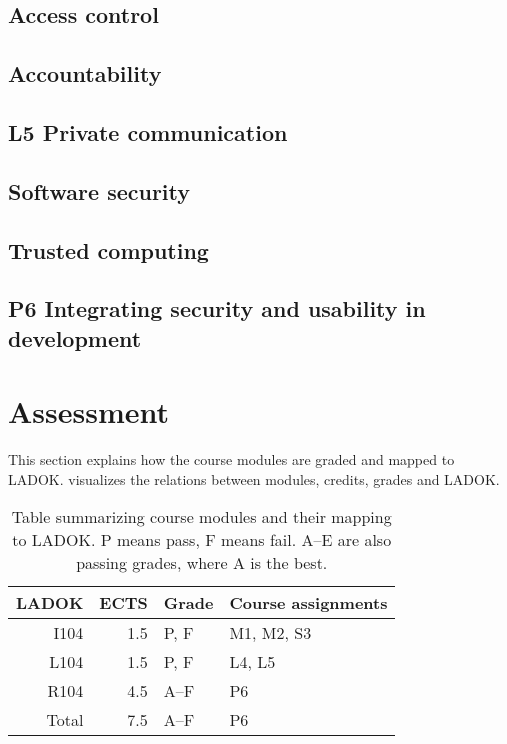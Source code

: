 \subsection{Access control}


\subsection{Accountability}


\subsection{L5 Private communication}


\subsection{Software security}


\subsection{Trusted computing}


\subsection{P6 Integrating security and usability in development}



\section{Assessment}%
\label{Assessment}

This section explains how the course modules are graded and mapped to LADOK\@.
 visualizes the relations between modules, credits, grades and 
LADOK\@.

\begin{table}
  \centering
  \setlength{\tabcolsep}{0.5em}
  \begin{tabular}{r r l l}
    \toprule
    LADOK & ECTS  & Grade       & Course assignments\\
    \midrule
    I104  & 1.5   & P, F        & M1, M2, S3\\
    L104  & 1.5   & P, F        & L4, L5\\
    R104  & 4.5   & A--F        & P6\\
    \midrule
    Total & 7.5   & A--F        & P6\\
    \bottomrule
  \end{tabular}
  \caption{%
    Table summarizing course modules and their mapping to LADOK\@.
    P means pass, F means fail.
    A--E are also passing grades, where A is the best.
  }\label{LADOKTable}
\end{table}

